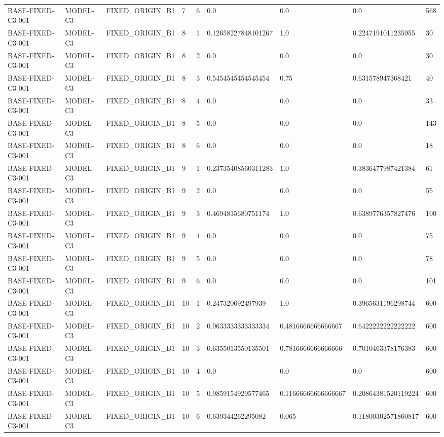 \begin{tabular}{lllllllll}
BASE-FIXED-C3-001 & MODEL-C3 & FIXED\_ORIGIN\_B1 & 7 & 6 & 0.0 & 0.0 & 0.0 & 568 \\
BASE-FIXED-C3-001 & MODEL-C3 & FIXED\_ORIGIN\_B1 & 8 & 1 & 0.12658227848101267 & 1.0 & 0.2247191011235955 & 30 \\
BASE-FIXED-C3-001 & MODEL-C3 & FIXED\_ORIGIN\_B1 & 8 & 2 & 0.0 & 0.0 & 0.0 & 30 \\
BASE-FIXED-C3-001 & MODEL-C3 & FIXED\_ORIGIN\_B1 & 8 & 3 & 0.5454545454545454 & 0.75 & 0.631578947368421 & 40 \\
BASE-FIXED-C3-001 & MODEL-C3 & FIXED\_ORIGIN\_B1 & 8 & 4 & 0.0 & 0.0 & 0.0 & 33 \\
BASE-FIXED-C3-001 & MODEL-C3 & FIXED\_ORIGIN\_B1 & 8 & 5 & 0.0 & 0.0 & 0.0 & 143 \\
BASE-FIXED-C3-001 & MODEL-C3 & FIXED\_ORIGIN\_B1 & 8 & 6 & 0.0 & 0.0 & 0.0 & 18 \\
BASE-FIXED-C3-001 & MODEL-C3 & FIXED\_ORIGIN\_B1 & 9 & 1 & 0.23735408560311283 & 1.0 & 0.3836477987421384 & 61 \\
BASE-FIXED-C3-001 & MODEL-C3 & FIXED\_ORIGIN\_B1 & 9 & 2 & 0.0 & 0.0 & 0.0 & 55 \\
BASE-FIXED-C3-001 & MODEL-C3 & FIXED\_ORIGIN\_B1 & 9 & 3 & 0.4694835680751174 & 1.0 & 0.6389776357827476 & 100 \\
BASE-FIXED-C3-001 & MODEL-C3 & FIXED\_ORIGIN\_B1 & 9 & 4 & 0.0 & 0.0 & 0.0 & 75 \\
BASE-FIXED-C3-001 & MODEL-C3 & FIXED\_ORIGIN\_B1 & 9 & 5 & 0.0 & 0.0 & 0.0 & 78 \\
BASE-FIXED-C3-001 & MODEL-C3 & FIXED\_ORIGIN\_B1 & 9 & 6 & 0.0 & 0.0 & 0.0 & 101 \\
BASE-FIXED-C3-001 & MODEL-C3 & FIXED\_ORIGIN\_B1 & 10 & 1 & 0.247320692497939 & 1.0 & 0.3965631196298744 & 600 \\
BASE-FIXED-C3-001 & MODEL-C3 & FIXED\_ORIGIN\_B1 & 10 & 2 & 0.9633333333333334 & 0.4816666666666667 & 0.6422222222222222 & 600 \\
BASE-FIXED-C3-001 & MODEL-C3 & FIXED\_ORIGIN\_B1 & 10 & 3 & 0.6355013550135501 & 0.7816666666666666 & 0.7010463378176383 & 600 \\
BASE-FIXED-C3-001 & MODEL-C3 & FIXED\_ORIGIN\_B1 & 10 & 4 & 0.0 & 0.0 & 0.0 & 600 \\
BASE-FIXED-C3-001 & MODEL-C3 & FIXED\_ORIGIN\_B1 & 10 & 5 & 0.9859154929577465 & 0.11666666666666667 & 0.20864381520119224 & 600 \\
BASE-FIXED-C3-001 & MODEL-C3 & FIXED\_ORIGIN\_B1 & 10 & 6 & 0.639344262295082 & 0.065 & 0.11800302571860817 & 600 \\

\end{tabular}
